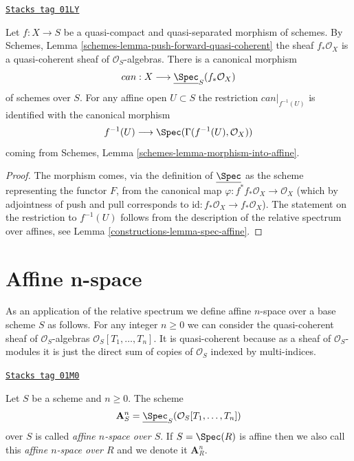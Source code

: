 \begin{lemma}
\label{constructions-lemma-canonical-morphism}
\href{https://stacks.math.columbia.edu/tag/01LY}{\texttt{Stacks tag 01LY}}

Let $f : X \to S$ be a quasi-compact and quasi-separated morphism
of schemes. By Schemes, Lemma \ref{schemes-lemma-push-forward-quasi-coherent}
the sheaf $f_*\mathcal{O}_X$ is a quasi-coherent sheaf of
$\mathcal{O}_S$-algebras. There is a canonical morphism
$$
can : X \longrightarrow \underline{\Spec}_S(f_*\mathcal{O}_X)
$$
of schemes over $S$.
For any affine open $U \subset S$ the restriction $can|_{f^{-1}(U)}$
is identified with the canonical morphism
$$
f^{-1}(U) \longrightarrow \Spec(\Gamma(f^{-1}(U), \mathcal{O}_X))
$$
coming from Schemes, Lemma \ref{schemes-lemma-morphism-into-affine}.
\end{lemma}

\begin{proof}

The morphism comes, via the definition of $\underline{\Spec}$
as the scheme representing the functor $F$, from the canonical map
$\varphi : f^*f_*\mathcal{O}_X \to \mathcal{O}_X$ (which by adjointness of
push and pull corresponds to
$\text{id} : f_*\mathcal{O}_X \to f_*\mathcal{O}_X$).
The statement on the restriction to $f^{-1}(U)$
follows from the description of the relative spectrum over
affines, see Lemma \ref{constructions-lemma-spec-affine}.
\end{proof}

\section{Affine n-space}
\label{constructions-section-affine-n-space}
As an application of the relative spectrum
we define affine $n$-space over a base scheme
$S$ as follows. For any integer $n \geq 0$ we can consider the
quasi-coherent sheaf of $\mathcal{O}_S$-algebras
$\mathcal{O}_S[T_1, \ldots, T_n]$. It is quasi-coherent because
as a sheaf of $\mathcal{O}_S$-modules it is just the direct sum
of copies of $\mathcal{O}_S$ indexed by multi-indices.

\begin{definition}
\label{constructions-definition-affine-n-space}
\href{https://stacks.math.columbia.edu/tag/01M0}{\texttt{Stacks tag 01M0}}

Let $S$ be a scheme and $n \geq 0$.
The scheme
$$
\mathbf{A}^n_S =
\underline{\Spec}_S(\mathcal{O}_S[T_1, \ldots, T_n])
$$
over $S$ is called {\it affine $n$-space over $S$}.
If $S = \Spec(R)$ is affine then we also call this
{\it affine $n$-space over $R$} and we denote it $\mathbf{A}^n_R$.
\end{definition}

